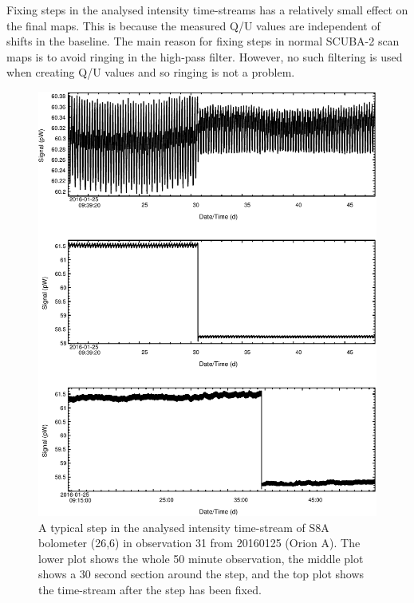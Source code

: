 \documentclass[twoside,11pt]{starlink}
\begin{document}
Fixing steps in the analysed intensity time-streams has a relatively
small effect on the final maps. This is because the measured Q/U values
are independent of shifts in the baseline. The main reason for fixing
steps in normal SCUBA-2 scan maps is to avoid ringing in the high-pass
filter. However, no such filtering is used when creating Q/U values and
so ringing is not a problem.

\begin{figure}
\includegraphics[width=\columnwidth]{steps1}
\caption{A typical step in the analysed intensity time-stream of S8A bolometer
(26,6) in observation 31 from 20160125 (Orion A). The lower plot shows
the whole 50 minute observation, the middle plot shows a 30 second
section around the step, and the top plot shows the time-stream after the
step has been fixed.}
\label{fig:steps1}
\end{figure}
\end{document}
